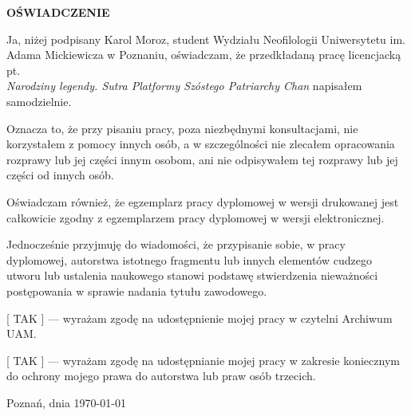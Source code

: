 \vspace*{7em}
\begin{center}
  \bfseries\large OŚWIADCZENIE
\end{center}

\vspace*{3em}
  Ja, niżej podpisany Karol Moroz, student Wydziału Neofilologii Uniwersytetu im. Adama Mickiewicza w Poznaniu, oświadczam, że przedkładaną pracę licencjacką pt.\\ {\itshape Narodziny legendy. Sutra Platformy Szóstego Patriarchy Chan} napisałem samodzielnie.

Oznacza to, że przy pisaniu pracy, poza niezbędnymi konsultacjami, nie korzystałem z pomocy innych osób, a w szczególności nie zlecałem opracowania rozprawy lub jej części innym osobom, ani nie odpisywałem tej rozprawy lub jej części od innych osób.

Oświadczam  również,  że  egzemplarz  pracy  dyplomowej  w  wersji  drukowanej  jest
całkowicie zgodny z egzemplarzem pracy dyplomowej w wersji elektronicznej.

Jednocześnie  przyjmuję  do  wiadomości,  że  przypisanie  sobie,  w pracy  dyplomowej, autorstwa  istotnego  fragmentu  lub  innych  elementów  cudzego  utworu  lub  ustalenia naukowego  stanowi  podstawę  stwierdzenia  nieważności  postępowania  w  sprawie
nadania tytułu zawodowego.

[ TAK ] --- wyrażam zgodę na udostępnienie mojej pracy w czytelni Archiwum UAM.

[ TAK ] --- wyrażam zgodę na udostępnianie mojej pracy w zakresie koniecznym do ochrony mojego prawa do autorstwa lub praw osób trzecich.

\vspace{2cm}
\begin{flushleft}
  Poznań, dnia \today
\end{flushleft}

\vspace*{\fill}
